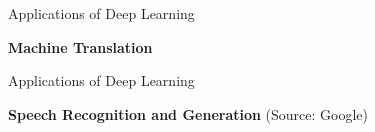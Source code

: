 \begin{frame}  {Applications of Deep Learning}
  \vspace{5mm}
  \begin{figure}
    \centering
  \end{figure}
    \hspace{4cm} \textbf{Machine Translation}
\end{frame}

\begin{frame}  {Applications of Deep Learning}
  \begin{figure}
    \centering

  \end{figure}
  \hspace{1cm} \textbf{Speech Recognition and Generation} (Source: Google)
\end{frame}

